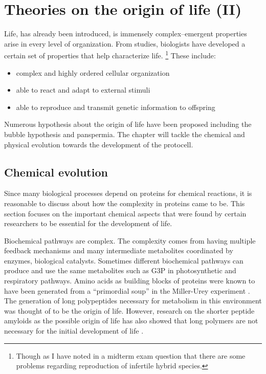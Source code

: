 \chapter{Theories on the origin of life (II)}

Life, has already been introduced, is immensely complex--emergent properties arise in every level of organization.
From studies, biologists have developed a certain set of properties that help characterize life.
\footnote{Though as I have noted in a midterm exam question that there are some problems regarding reproduction of infertile hybrid species.}
These include:

\begin{itemize}
    \item complex and highly ordered cellular organization
    \item able to react and adapt to external stimuli
    \item able to reproduce and transmit genetic information to offspring
\end{itemize}

Numerous hypothesis about the origin of life have been proposed including the bubble hypothesis and panspermia.
The chapter will tackle the chemical and physical evolution towards the development of the protocell.

\section{Chemical evolution}
Since many biological processes depend on proteins for chemical reactions, it is reasonable to discuss about how the complexity in proteins came to be.
This section focuses on the important chemical aspects that were found by certain researchers to be essential for the development of life.

Biochemical pathways are complex.
The complexity comes from having multiple feedback mechanisms and many intermediate metabolites coordinated by enzymes, biological catalysts.
Sometimes different biochemical pathways can produce and use the same metabolites such as G3P in photosynthetic and respiratory pathways.
Amino acids as building blocks of proteins were known to have been generated from a ``primordial soup'' in the Miller-Urey experiment \cite{Maruyama2019}.
The generation of long polypeptides necessary for metabolism in this environment was thought of to be the origin of life.
However, research on the shorter peptide amyloids as the possible origin of life has also showed that long polymers are not necessary for the initial development of life \cite{Greenwald2018}.


